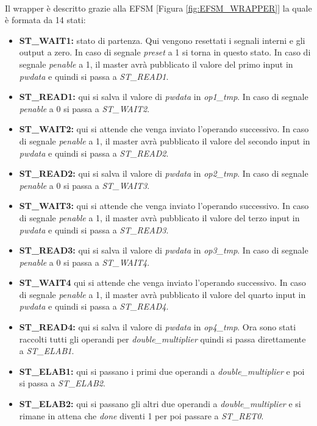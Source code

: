 \documentclass[]{IEEEtran}
\begin{document}
\\Il wrapper è descritto grazie alla EFSM [Figura \ref{fig:EFSM_WRAPPER}] la quale è formata da 14 stati:
\begin{itemize}
    \item \textbf{ST\_WAIT1:} stato di partenza. Qui vengono resettati i segnali interni e gli output a zero. In caso di segnale \textit{preset} a 1 si torna in questo stato. In caso di segnale \textit{penable} a 1, il master avrà pubblicato il valore del primo input in \textit{pwdata} e quindi si passa a \textit{ST\_READ1}.
    \item \textbf{ST\_READ1:} qui si salva il valore di \textit{pwdata} in \textit{op1\_tmp}. In caso di segnale \textit{penable} a 0 si passa a \textit{ST\_WAIT2}.
    \item \textbf{ST\_WAIT2:} qui si attende che venga inviato l'operando successivo. In caso di segnale \textit{penable} a 1, il master avrà pubblicato il valore del secondo input in \textit{pwdata} e quindi si passa a \textit{ST\_READ2}.
    \item \textbf{ST\_READ2:} qui si salva il valore di \textit{pwdata} in \textit{op2\_tmp}. In caso di segnale \textit{penable} a 0 si passa a \textit{ST\_WAIT3}.
    \item \textbf{ST\_WAIT3:} qui si attende che venga inviato l'operando successivo. In caso di segnale \textit{penable} a 1, il master avrà pubblicato il valore del terzo input in \textit{pwdata} e quindi si passa a \textit{ST\_READ3}.
    \item \textbf{ST\_READ3:} qui si salva il valore di \textit{pwdata} in \textit{op3\_tmp}. In caso di segnale \textit{penable} a 0 si passa a \textit{ST\_WAIT4}.
    \item \textbf{ST\_WAIT4} qui si attende che venga inviato l'operando successivo. In caso di segnale \textit{penable} a 1, il master avrà pubblicato il valore del quarto input in \textit{pwdata} e quindi si passa a \textit{ST\_READ4}.
    \item \textbf{ST\_READ4:} qui si salva il valore di \textit{pwdata} in \textit{op4\_tmp}. Ora sono stati raccolti tutti gli operandi per \textit{double\_multiplier} quindi si passa direttamente a \textit{ST\_ELAB1}.
    \item \textbf{ST\_ELAB1:} qui si passano i primi due operandi a \textit{double\_multiplier} e poi si passa a \textit{ST\_ELAB2}.
    \item \textbf{ST\_ELAB2:} qui si passano gli altri due operandi a \textit{double\_multiplier} e si rimane in attena che \textit{done} diventi 1 per poi passare a \textit{ST\_RET0}.

\end{itemize}
\end{document}
